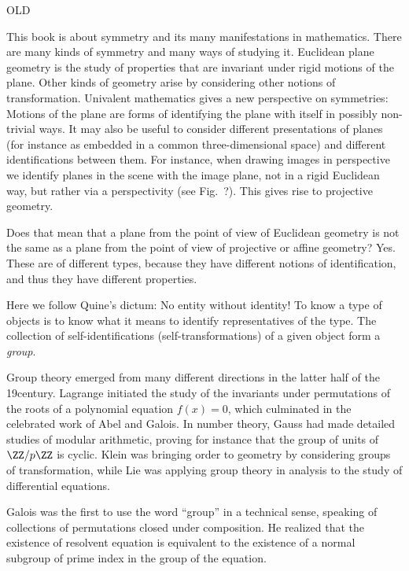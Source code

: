 %






OLD

This book is about symmetry and its many manifestations in mathematics.
There are many kinds of symmetry and many ways of studying it.
Euclidean plane geometry is the study of properties that are invariant under rigid motions of the plane.
Other kinds of geometry arise by considering other notions of transformation.
Univalent mathematics gives a new perspective on symmetries:
Motions of the plane are forms of identifying the plane with itself in possibly non-trivial ways.
It may also be useful to consider different presentations of planes
(for instance as embedded in a common three-dimensional space)
and different identifications between them.
For instance, when drawing images in perspective
we identify planes in the scene with the image plane,
not in a rigid Euclidean way, but
rather via a perspectivity (see Fig.~?).
This gives rise to projective geometry.

Does that mean that a plane from the point of view of Euclidean
geometry is not the same as a plane from the point of view of
projective or affine geometry?
Yes.
These are of different types,
because they have different notions of identification,
and thus they have different properties.

Here we follow Quine's dictum: No entity without identity!
To know a type of objects is to know what it means to identify representatives of the type.
The collection of self-identifications (self-transformations) of a given object form a \emph{group}.


Group theory emerged from many different directions in the latter half of the 19\th century.
Lagrange initiated the study of the invariants under permutations
of the roots of a polynomial equation $f(x)=0$,
which culminated in the celebrated work of Abel and Galois.
In number theory, Gauss had made detailed studies of modular arithmetic,
proving for instance that the group of units of $\ZZ/p\ZZ$ is cyclic.
Klein was bringing order to geometry by considering groups of transformation,
while Lie was applying group theory in analysis to the study of differential equations.

Galois was the first to use the word ``group'' in a technical sense,
speaking of collections of permutations closed under composition.
He realized that the existence of resolvent equation is equivalent
to the existence of a normal subgroup of prime index
in the group of the equation.

